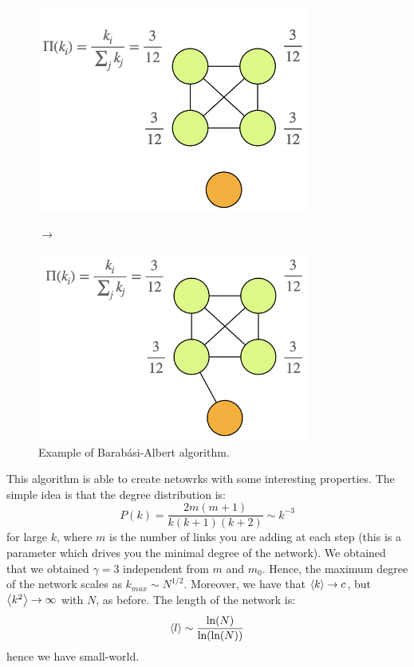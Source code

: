 \documentclass[../main/main.tex]{subfiles}
\begin{document}
\begin{figure}[h!]
\begin{minipage}[c]{0.48\linewidth}
\centering
\includegraphics[width=0.8\textwidth]{../lessons/image/06/6.png}
\end{minipage}
\( \longrightarrow  \)
\begin{minipage}[]{0.48\linewidth}
\centering
\includegraphics[width=0.8\textwidth]{../lessons/image/06/7.png}
\end{minipage}
\caption{\label{fig:06_5} Example of Barabási-Albert algorithm.}
\end{figure}

This algorithm is able to create netowrks with some interesting properties. The simple idea is that the degree distribution is:
\begin{equation*}
  P(k) = \frac{2 m (m +1)}{k(k+1)(k+2)} \sim k^{-3}
\end{equation*}
for large \( k \), where \( m \) is the number of links you are adding at each step (this is a parameter which drives you the minimal degree of the network).
We obtained that we obtained \( \gamma =3  \) independent from \( m \) and \( m_0 \). Hence, the maximum degree of the network scales as \( k_{max} \sim N^{1/2} \). Moreover, we have that \( \expval{k} \rightarrow c \), but \( \expval{k^2} \rightarrow \infty   \) with \( N \), as before.
The length of the network is:
\begin{equation*}
  \expval{l} \sim \frac{\ln (N)}{\ln (\ln (N))}
\end{equation*}
hence we have small-world.
\end{document}
